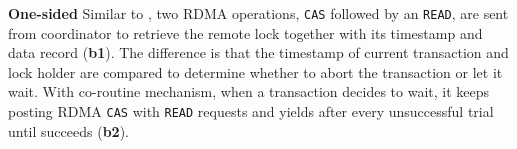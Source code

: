 {\bf One-sided} Similar to \nowait, two RDMA operations, \texttt{CAS} followed by an \texttt{READ},
are sent from coordinator to retrieve the remote lock together with
its timestamp and data record (\step \textbf{b1}). 
The difference is that 
the timestamp of current transaction and lock holder are compared 
to determine whether to abort the transaction or let it wait. 
With co-routine mechanism, when a transaction decides to wait, 
it keeps posting RDMA \texttt{CAS} with \texttt{READ} requests and yields after every unsuccessful trial until succeeds (\step \textbf{b2}).






